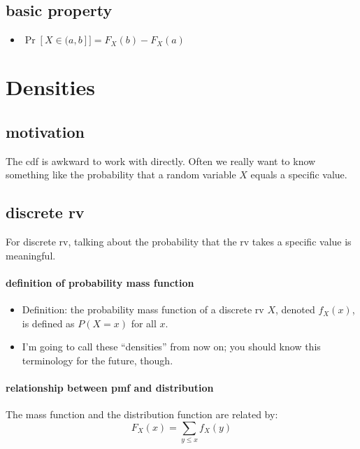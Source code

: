 \subsection{basic property}

\begin{itemize}
\item $\Pr[X ∈ (a, b]] = F_X(b) - F_X(a)$
\end{itemize}

\section{Densities}

\subsection{motivation}

     The cdf is awkward to work with directly.  Often we really want to
     know something like the probability that a random variable $X$
     equals a specific value.

\subsection{discrete rv}

     For discrete rv, talking about the probability that the rv takes a
     specific value is meaningful.

\paragraph{definition of probability mass function}

\begin{itemize}
\item Definition: the probability mass function of a discrete rv
        $X$, denoted $f_X(x)$, is defined as $P(X = x)$ for all $x$.
\item I'm going to call these ``densities'' from now on; you should know
        this terminology for the future, though.
\end{itemize}

\paragraph{relationship between pmf and distribution}

      The mass function and the distribution function are related by:
      \[F_X(x) = ∑_{y ≤ x} f_X(y)\]

